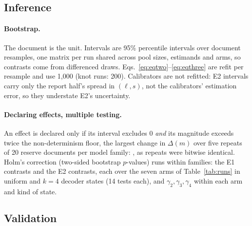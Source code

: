 \subsection{Inference}
\label{sec:inference}

\paragraph{Bootstrap.}
The document is the unit. Intervals are 95\% percentile intervals over \VivaNBoot{} document
resamples, one matrix per run shared across pool sizes, estimands and arms, so contrasts
come from differenced draws. Eqs.~\ref{eq:eqtwo}--\ref{eq:eqthree} are refit per resample and use 1,000 (knot runs: 200).
Calibrators are not refitted: E2 intervals carry only the report half's spread in $(\ell,s)$, not
the calibrators' estimation error, so they understate E2's uncertainty.

\paragraph{Declaring effects, multiple testing.}
An effect is declared only if its interval excludes 0 \emph{and} its magnitude exceeds twice
the non-determinism floor, the largest change in $\Delta(m)$ over five repeats of 20
reserve documents per model family: \VivaLladaFloor{}, as repeats were bitwise identical.
Holm's correction (two-sided bootstrap $p$-values) runs within families: the E1 contrasts and the
E2 contrasts, each over the seven arms of Table~\ref{tab:runs} in uniform and $k{=}4$ decoder
states (14 tests each), and $\gamma_2,\gamma_3,\gamma_4$ within each arm and kind of state. 

\subsection{Validation}
\label{sec:validation}

